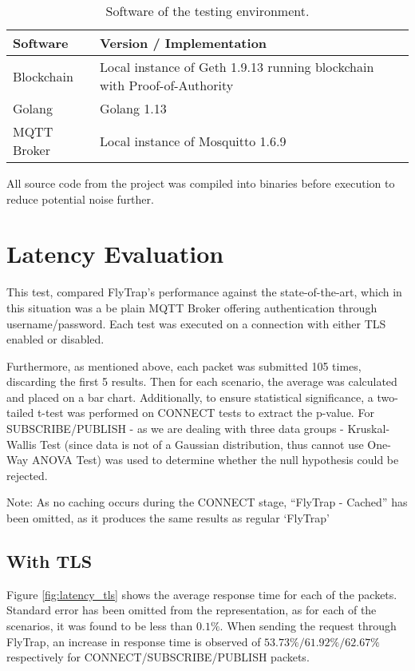 \begin{table}[h]
\centering
\begin{tabular}{|l|l|}
\hline
\textbf{Software} & \textbf{Version / Implementation}                                        \\ \hline
Blockchain        & Local instance of Geth 1.9.13 running blockchain with Proof-of-Authority \\ \hline
Golang            & Golang 1.13                                                              \\ \hline
MQTT Broker       & Local instance of Mosquitto 1.6.9                                        \\ \hline
\end{tabular}
\caption{Software of the testing environment.}
\label{tab:sw}
\end{table}

All source code from the project was compiled into binaries before execution to reduce potential noise further.

\section{Latency Evaluation}
This test, compared FlyTrap's performance against the state-of-the-art, which in this situation was a be plain MQTT Broker offering authentication through username/password. Each test was executed on a connection with either TLS enabled or disabled.

Furthermore, as mentioned above, each packet was submitted 105 times, discarding the first 5 results. Then for each scenario, the average was calculated and placed on a bar chart. Additionally, to ensure statistical significance, a two-tailed t-test was performed on CONNECT tests to extract the p-value. For SUBSCRIBE/PUBLISH - as we are dealing with three data groups - Kruskal-Wallis Test (since data is not of a Gaussian distribution, thus cannot use One-Way ANOVA Test) was used to determine whether the null hypothesis could be rejected.

Note: As no caching occurs during the CONNECT stage, ``FlyTrap - Cached'' has been omitted, as it produces the same results as regular `FlyTrap'

\subsection{With TLS}\label{sec:tls_eval}
Figure \ref{fig:latency_tls} shows the average response time for each of the packets. Standard error has been omitted from the representation, as for each of the scenarios, it was found to be less than $0.1\%$. When sending the request through FlyTrap, an increase in response time is observed of $53.73\%/61.92\%/62.67\%$ respectively for CONNECT/SUBSCRIBE/PUBLISH packets.

